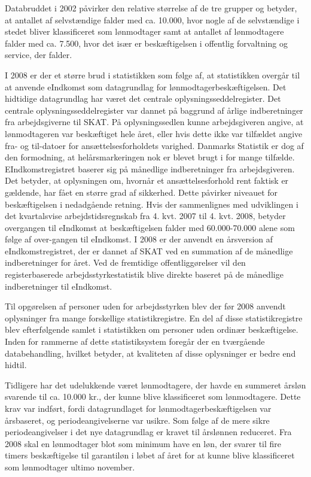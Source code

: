 {Databruddet i 2002 påvirker den relative størrelse af de tre grupper og betyder, at antallet af selvstændige falder med ca. 10.000, hvor nogle af de selvstændige i stedet bliver klassificeret som lønmodtager samt at antallet af lønmodtagere falder med ca. 7.500, hvor det især er beskæftigelsen i offentlig forvaltning og service, der falder.

I 2008 er der et større brud i statistikken som følge af, at statistikken overgår til at anvende eIndkomst som datagrundlag for lønmodtagerbeskæftigelsen. Det hidtidige datagrundlag har været det centrale oplysningsseddelregister. Det centrale oplysningsseddelregister var dannet på baggrund af årlige indberetninger fra arbejdsgiverne til SKAT. På oplysningssedlen kunne arbejdsgiveren angive, at lønmodtageren var beskæftiget hele året, eller hvis dette ikke var tilfældet angive fra- og til-datoer for ansættelsesforholdets varighed. Danmarks Statistik er dog af den formodning, at helårsmarkeringen nok er blevet brugt i for mange tilfælde. EIndkomstregistret baserer sig på månedlige indberetninger fra arbejdsgiveren. Det betyder, at oplysningen om, hvornår et ansættelsesforhold rent faktisk er gældende, har fået en større grad af sikkerhed. Dette påvirker niveauet for beskæftigelsen i nedadgående retning. Hvis der sammenlignes med udviklingen i det kvartalsvise arbejdstidsregnskab fra 4. kvt. 2007 til 4. kvt. 2008, betyder overgangen til eIndkomst at beskæftigelsen falder med 60.000-70.000 alene som følge af over-gangen til eIndkomst. I 2008 er der anvendt en årsversion af eIndkomstregistret, der er dannet af SKAT ved en summation af de månedlige indberetninger for året. Ved de fremtidige offentliggørelser vil den registerbaserede arbejdsstyrkestatistik blive direkte baseret på de månedlige indberetninger til eIndkomst.

Til opgørelsen af personer uden for arbejdsstyrken blev der før 2008 anvendt oplysninger fra mange forskellige statistikregistre. En del af disse statistikregistre blev efterfølgende samlet i statistikken om personer uden ordinær beskæftigelse. Inden for rammerne af dette statistiksystem foregår der en tværgående databehandling, hvilket betyder, at kvaliteten af disse oplysninger er bedre end hidtil.

Tidligere har det udelukkende været lønmodtagere, der havde en summeret årsløn svarende til ca. 10.000 kr., der kunne blive klassificeret som lønmodtagere. Dette krav var indført, fordi datagrundlaget for lønmodtagerbeskæftigelsen var årsbaseret, og periodeangivelserne var usikre. Som følge af de mere sikre periodeangivelser i det nye datagrundlag er kravet til årslønnen reduceret. Fra 2008 skal en lønmodtager blot som minimum have en løn, der svarer til fire timers beskæftigelse til garantiløn i løbet af året for at kunne blive klassificeret som lønmodtager ultimo november.

}
